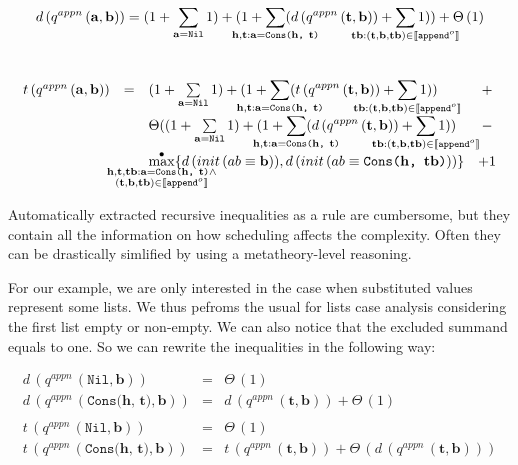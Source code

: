\[
d\,(q^{appn}\,(\mathbf{a}, \mathbf{b}))  = (1 + \sum\limits_{\mathbf{a} = \texttt{Nil}} 1) + (1 + \smashoperator{\sum\limits_{\mathbf{h}, \mathbf{t}: \mathbf{a} = \texttt{Cons($\mathbf{h}$, $\mathbf{t}$)}}} (d\,(q^{appn}\,(\mathbf{t}, \mathbf{b})) + \smashoperator{\sum\limits_{\mathbf{tb} : (\mathbf{t}, \mathbf{b}, \mathbf{tb}) \in \llbracket \texttt{append$^o$} \rrbracket}} 1)) + \Theta\,(1)
\]\\[0.8mm]
\[
\begin{array}{lclc}
t\,(q^{appn}\,(\mathbf{a}, \mathbf{b})) & = & (1 + \sum\limits_{\mathbf{a} = \texttt{Nil}} 1) + (1 + \smashoperator{\sum\limits_{\mathbf{h}, \mathbf{t}: \mathbf{a} = \texttt{Cons($\mathbf{h}$, $\mathbf{t}$)}}} (t\,(q^{appn}\,(\mathbf{t}, \mathbf{b})) + \smashoperator{\sum\limits_{\mathbf{tb} : (\mathbf{t}, \mathbf{b}, \mathbf{tb}) \in \llbracket \texttt{append$^o$} \rrbracket}} 1)) & + \\
 & &\Theta((1 + \sum\limits_{\mathbf{a} = \texttt{Nil}} 1) + (1 + \smashoperator{\sum\limits_{\mathbf{h}, \mathbf{t}: \mathbf{a} = \texttt{Cons($\mathbf{h}$, $\mathbf{t}$)}}} (d\,(q^{appn}\,(\mathbf{t}, \mathbf{b})) + \smashoperator{\sum\limits_{\mathbf{tb} : (\mathbf{t}, \mathbf{b}, \mathbf{tb}) \in \llbracket \texttt{append$^o$} \rrbracket}} 1)) & - \\
& & \smashoperator{\maxd\limits_{\substack{
                                   \mathbf{h}, \mathbf{t}, \mathbf{tb}: \mathbf{a} = \texttt{Cons($\mathbf{h}$, $\mathbf{t}$)} \land \\
                                   (\mathbf{t}, \mathbf{b}, \mathbf{tb}) \in \llbracket \texttt{append$^o$} \rrbracket
                                 }
                                }} \{ d\,(init\,(\unigoal{ab}{\mathbf{b}})), d\,(init\,(\unigoal{ab}{\texttt{Cons($\mathbf{h}$, $\mathbf{tb}$)}})) \} & + 1 
\end{array}
\]


Automatically extracted recursive inequalities as a rule are cumbersome, but they contain all the information on how scheduling affects the complexity.
Often they can be drastically simlified by using a metatheory-level reasoning.

For our example, we are only interested in the case when substituted values represent some lists. We thus pefroms the usual for lists case analysis
considering the first list empty or non-empty. We can also notice that the excluded summand equals to one. So we can rewrite the inequalities in the following way:

\[
\begin{array}{lcl}
d\,(q^{appn}\,(\texttt{Nil}, \mathbf{b})) & = & \Theta\,(1) \\
d\,(q^{appn}\,(\texttt{Cons($\mathbf{h}$, $\mathbf{t}$)}, \mathbf{b})) & = & d\,(q^{appn}\,(\mathbf{t}, \mathbf{b})) + \Theta\,(1) \\
\\
t\,(q^{appn}\,(\texttt{Nil}, \mathbf{b})) & = & \Theta\,(1) \\
t\,(q^{appn}\,(\texttt{Cons($\mathbf{h}$, $\mathbf{t}$)}, \mathbf{b})) & = & t\,(q^{appn}\,(\mathbf{t}, \mathbf{b})) + \Theta\,(d\,(q^{appn}\,(\mathbf{t}, \mathbf{b}))) \\
\end{array}
 \]
 
